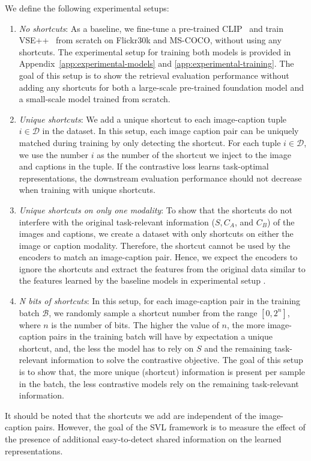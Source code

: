 We define the following experimental setups:
\begin{enumerate}[label=\Roman*]
	\item \emph{No shortcuts}: As a baseline, we fine-tune a pre-trained CLIP~\citep{radford2021learning} and train VSE++~\citep{faghri2018improving} from scratch on \ac{Flickr30k} and \ac{MS-COCO}, without using any shortcuts. 
	The experimental setup for training both models is provided in Appendix~\ref{app:experimental-models} and \ref{app:experimental-training}. 
	The goal of this setup is to show the retrieval evaluation performance without adding any shortcuts for both a large-scale pre-trained foundation model and a small-scale model trained from scratch.
	\item \emph{Unique shortcuts}: We add a unique shortcut to each image-caption tuple $i \in\mathcal{D}$ in the dataset. 
	In this setup, each image caption pair can be uniquely matched during training by only detecting the shortcut. 
	For each tuple $i \in \mathcal{D}$, we use the number $i$ as the number of the shortcut we inject to the image and captions in the tuple.
	If the contrastive loss learns task-optimal representations, the downstream evaluation performance should not decrease when training with unique shortcuts.
	\item \emph{Unique shortcuts on only one modality}: To show that the shortcuts do not interfere with the original task-relevant information ($S, C_A$, and $C_B$) of the images and captions, we create a dataset with only shortcuts on either the image or caption modality. Therefore, the shortcut cannot be used by the encoders to match an image-caption pair. 
	Hence, we expect the encoders to ignore the shortcuts and extract the features from the original data similar to the features learned by the baseline models in experimental setup .
	\item \emph{N bits of shortcuts}: In this setup, for each image-caption pair in the training batch $\mathcal{B}$, we randomly sample a shortcut number from the range $[0, 2^{n}]$, where $n$ is the number of bits.
	The higher the value of $n$, the more image-caption pairs in the training batch will have by expectation a unique shortcut, and, the less the model has to rely on $S$ and the remaining task-relevant information to solve the contrastive objective. 
	The goal of this setup is to show that, the more unique (shortcut) information is present per sample in the batch, the less contrastive models rely on the remaining task-relevant information.
\end{enumerate}
 It should be noted that the shortcuts we add are independent of the image-caption pairs. 
 However, the goal of the \ac{SVL} framework is to measure the effect of the presence of additional easy-to-detect shared information on the learned representations. 

